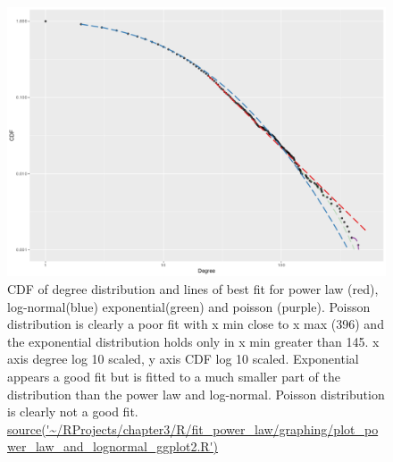 \begin{figure}
    \centering
    \includegraphics[width=\textwidth]{images/chapter3/poweRlaw/Rplot_best_fit_pl_lognorm_smaller.png}
    \caption{CDF of degree distribution and lines of best fit for power law (red), log-normal(blue) exponential(green) and poisson (purple). Poisson distribution is clearly a poor fit with x min close to x max (396) and the exponential distribution holds only in x min greater than 145. x axis degree log 10 scaled, y axis CDF log 10 scaled. Exponential appears a good fit but is fitted to a much smaller part of the distribution than the power law and log-normal. Poisson distribution is clearly not a good fit. \url{source('~/RProjects/chapter3/R/fit_power_law/graphing/plot_power_law_and_lognormal_ggplot2.R')}}
    \label{fig:CDF degreel}
\end{figure}

